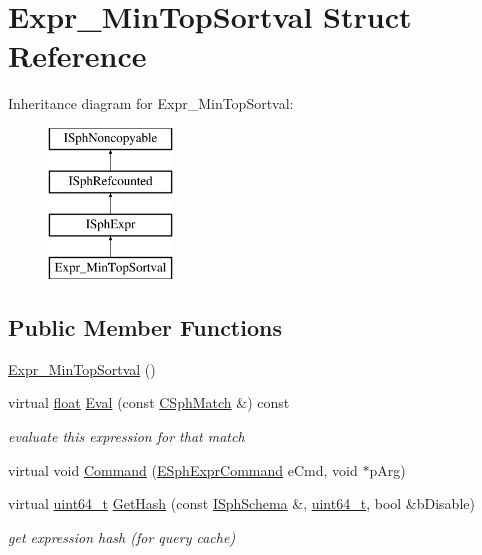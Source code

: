 \hypertarget{structExpr__MinTopSortval}{\section{Expr\-\_\-\-Min\-Top\-Sortval Struct Reference}
\label{structExpr__MinTopSortval}
}
Inheritance diagram for Expr\-\_\-\-Min\-Top\-Sortval\-:\begin{figure}[H]
\begin{center}
\leavevmode
\includegraphics[height=4.000000cm]{structExpr__MinTopSortval}
\end{center}
\end{figure}
\subsection*{Public Member Functions}
\begin{DoxyCompactItemize}
\item 
\hyperlink{structExpr__MinTopSortval_a419840bd065078c50aa5e239e34a824a}{Expr\-\_\-\-Min\-Top\-Sortval} ()
\item 
virtual \hyperlink{sphinxexpr_8cpp_a0e0d0739f7035f18f949c2db2c6759ec}{float} \hyperlink{structExpr__MinTopSortval_a7523849b1cbc7bafee04b25e08ad8285}{Eval} (const \hyperlink{classCSphMatch}{C\-Sph\-Match} \&) const 
\begin{DoxyCompactList}\small\item\em evaluate this expression for that match \end{DoxyCompactList}\item 
virtual void \hyperlink{structExpr__MinTopSortval_a1a0fd913ba1c8747c02e877c2aeb5d0e}{Command} (\hyperlink{sphinxexpr_8h_a30be184fb07bd80c271360fc6094c818}{E\-Sph\-Expr\-Command} e\-Cmd, void $\ast$p\-Arg)
\item 
virtual \hyperlink{sphinxstd_8h_aaa5d1cd013383c889537491c3cfd9aad}{uint64\-\_\-t} \hyperlink{structExpr__MinTopSortval_a86d081616b840be14d8ddf9bd1a480f0}{Get\-Hash} (const \hyperlink{classISphSchema}{I\-Sph\-Schema} \&, \hyperlink{sphinxstd_8h_aaa5d1cd013383c889537491c3cfd9aad}{uint64\-\_\-t}, bool \&b\-Disable)
\begin{DoxyCompactList}\small\item\em get expression hash (for query cache) \end{DoxyCompactList}\end{DoxyCompactItemize}
